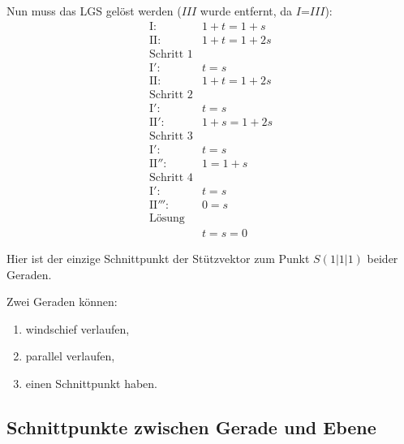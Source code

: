 \begin{flushleft}
Nun muss das LGS gelöst werden ($III$ wurde entfernt, da $I$=$III$):
\begin{align}
    \text{I}\colon& 1+t=1+s \\
    \text{II}\colon& 1+t=1+2s \\
    \text{Schritt 1}& \\
    \text{I}'\colon& t=s \\
    \text{II}\colon& 1+t=1+2s \\
    \text{Schritt 2}& \\
    \text{I}'\colon& t=s \\
    \text{II}'\colon& 1+s=1+2s \\
    \text{Schritt 3}& \\
    \text{I}'\colon& t=s \\
    \text{II}''\colon& 1=1+s \\
    \text{Schritt 4}& \\
    \text{I}'\colon& t=s \\
    \text{II}'''\colon& 0=s \\
    \text{Lösung}& \\
    &t=s=0
\end{align}

Hier ist der einzige Schnittpunkt der Stützvektor zum Punkt $S(1|1|1)$ beider Geraden.

Zwei Geraden können:
\begin{enumerate}
    \item {windschief verlaufen,}
    \item {parallel verlaufen,}
    \item {einen Schnittpunkt haben.}
\end{enumerate}
\end{flushleft}

\subsection{Schnittpunkte zwischen Gerade und Ebene}
